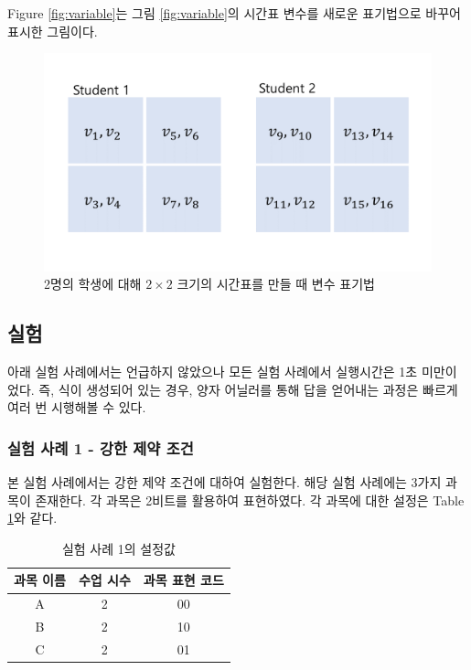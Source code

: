 \documentclass[12pt,a4paper]{article}
\begin{document}
    Figure \ref{fig:variable}는 그림 \ref{fig:variable}의 시간표 변수를 새로운 표기법으로 바꾸어 표시한 그림이다.

    \begin{figure}[htb!]
        \centering
        \includegraphics[width=\columnwidth]{var2.png}
        \caption{2명의 학생에 대해 $2 \times 2$ 크기의 시간표를 만들 때 변수 표기법}
        \label{fig:newvar}
    \end{figure}

    \subsection{실험}

    아래 실험 사례에서는 언급하지 않았으나 모든 실험 사례에서 실행시간은 1초 미만이었다. 즉, 식이 생성되어 있는 경우, 양자 어닐러를 통해 답을 얻어내는 과정은 빠르게 여러 번 시행해볼 수 있다.

    \subsubsection{실험 사례 1 - 강한 제약 조건}

    본 실험 사례에서는 강한 제약 조건에 대하여 실험한다. 해당 실험 사례에는 3가지 과목이 존재한다. 각 과목은 2비트를 활용하여 표현하였다. 각 과목에 대한 설정은 Table \ref{tab:testcase1}와 같다.

    \begin{table}[htb!]
        \centering
        \begin{tabular}{c c c}
             \hline
             과목 이름 & 수업 시수 & 과목 표현 코드\\
             \hline
             A & 2 & 00 \\
             B & 2 & 10 \\
             C & 2 & 01 \\
             \hline
        \end{tabular}
        \caption{실험 사례 1의 설정값}\label{tab:testcase1}
    \end{table}
\end{document}
